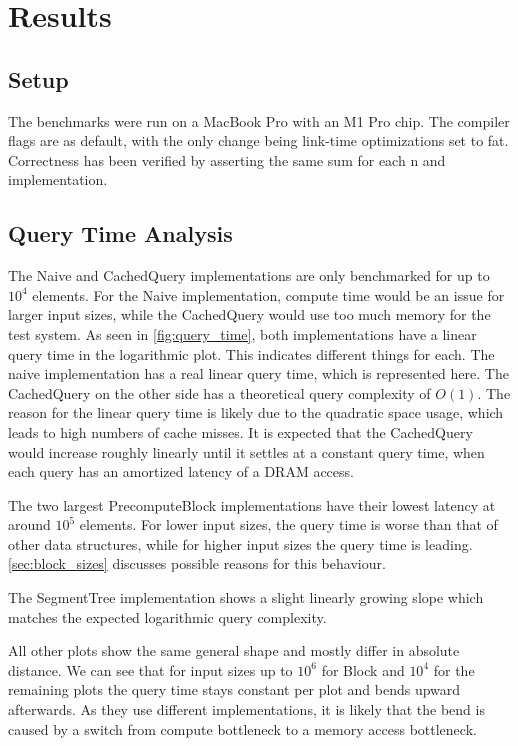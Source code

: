 \documentclass[a4paper,UKenglish,cleveref,thm-restate]{lipics-v2021}
\begin{document}
\section{Results}

\subsection{Setup}

The benchmarks were run on a MacBook Pro with an M1 Pro chip. 
The compiler flags are as default, with the only change being 
link-time optimizations set to fat. Correctness has been verified 
by asserting the same sum for each n and implementation.

\subsection{Query Time Analysis}

The Naive and CachedQuery implementations are only benchmarked for up 
to $10^4$ elements. For the Naive implementation, compute time would 
be an issue for larger input sizes, while the CachedQuery would
use too much memory for the test system. As seen in \autoref{fig:query_time}, 
both implementations have a linear query time in the logarithmic plot.
This indicates different things for each. The naive implementation has a real 
linear query time, which is represented here. The CachedQuery on the other side 
has a theoretical query complexity of $O(1)$. The reason for the linear 
query time is likely due to the quadratic space usage, which leads to 
high numbers of cache misses. It is expected that the CachedQuery would increase 
roughly linearly until it settles at a constant query time, when 
each query has an amortized latency of a DRAM access. 

The two largest PrecomputeBlock implementations have their lowest latency at 
around $10^5$ elements. For lower input sizes, the query time is worse than that of 
other data structures, while for higher input sizes the query time is leading.
\autoref{sec:block_sizes} discusses possible reasons for this behaviour.

The SegmentTree implementation shows a slight linearly growing slope
which matches the expected logarithmic query complexity.

All other plots show the same general shape and mostly differ in absolute distance. 
We can see that for input sizes up to $10^6$ for Block and $10^4$ for the remaining
plots the query time stays constant per plot 
and bends upward afterwards. As they use different implementations, it is likely
that the bend is caused by a switch from 
compute bottleneck to a memory access bottleneck.
\end{document}

